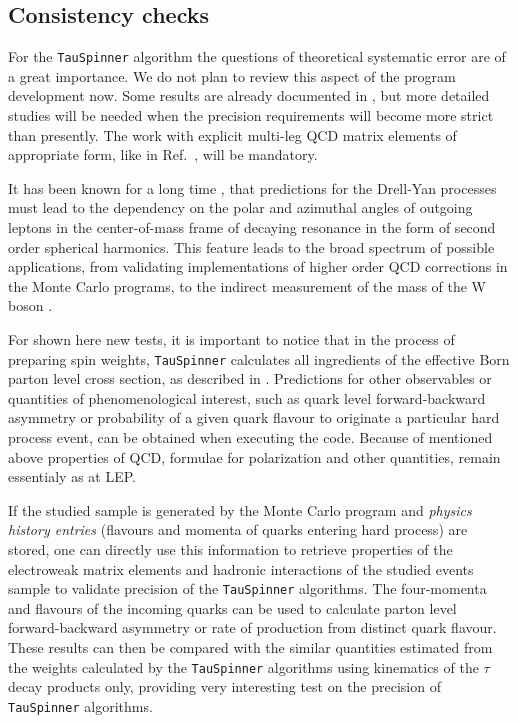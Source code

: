\documentclass{article}
\begin{document}
\newpage
\subsection{Consistency checks}\label{Sec:consistency-check}

For the  {\tt TauSpinner}   algorithm the questions of theoretical 
systematic error are of a  great importance. We do not plan to review 
this aspect of the program development now. Some results are already 
documented in \cite{Czyczula:2012ny,Banerjee:2012ez}, but more detailed studies
will be needed when the precision requirements will become more strict than 
presently. The work with explicit multi-leg QCD matrix elements of appropriate form, 
like in Ref.~\cite{vanHameren:2008dy}, will be mandatory.

It has been  known for a long time \cite{Mirkes:1992hu,Mirkes:1994eb}, that predictions for the Drell-Yan 
processes must lead to the dependency on the polar and azimuthal angles of outgoing leptons in the 
center-of-mass frame of decaying resonance in the form of second order spherical harmonics.
This feature leads to the broad spectrum of possible applications, from validating
implementations of higher order QCD corrections in the Monte Carlo programs,
to the indirect measurement of the mass of the W boson \cite{Aaltonen:2013wcp}.

For shown here new tests, 
it is important to notice  that in the process of preparing
spin weights, {\tt TauSpinner} calculates 
all ingredients of the effective Born parton level cross section, 
as described 
in \cite{jadach-was:1984,Eberhard:1989ve,Pierzchala:2001gc,Jadach:1993hs}. 
Predictions for other observables or quantities of phenomenological interest, 
such as quark level forward-backward asymmetry or probability of 
a given quark flavour 
to originate a particular hard process event, can be obtained when executing the code. 
Because of mentioned above properties of QCD,  formulae for polarization and 
other quantities, remain essentialy as at LEP.

If the studied sample is generated by the Monte Carlo
program and  {\it physics  history entries} (flavours and momenta of quarks 
entering hard process) are stored, 
one can directly use this information
to retrieve properties of the electroweak matrix elements and hadronic interactions of the studied
events sample to validate precision of the {\tt TauSpinner} algorithms. 
The four-momenta and flavours of the incoming quarks can be used to calculate
parton level forward-backward asymmetry or rate of production from distinct quark flavour.
These results can then be compared with the similar quantities estimated from the
weights calculated by the {\tt TauSpinner} algorithms using kinematics of the $\tau$ decay products only,
providing very interesting test on the precision of  {\tt TauSpinner} algorithms.
\end{document}
